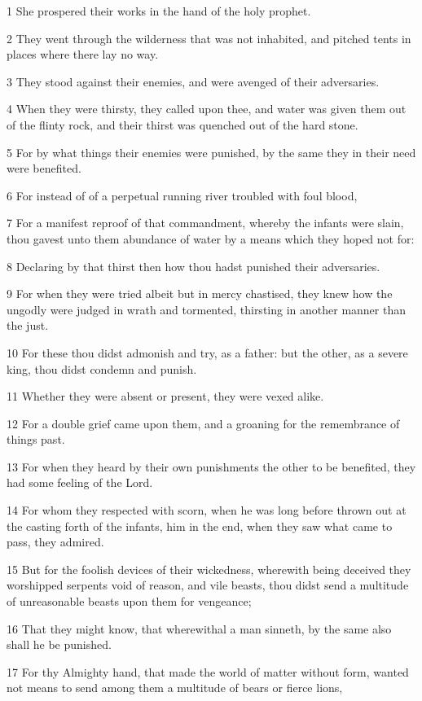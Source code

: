 \par 1 She prospered their works in the hand of the holy prophet.
\par 2 They went through the wilderness that was not inhabited, and pitched tents in places where there lay no way.
\par 3 They stood against their enemies, and were avenged of their adversaries.
\par 4 When they were thirsty, they called upon thee, and water was given them out of the flinty rock, and their thirst was quenched out of the hard stone.
\par 5 For by what things their enemies were punished, by the same they in their need were benefited.
\par 6 For instead of of a perpetual running river troubled with foul blood,
\par 7 For a manifest reproof of that commandment, whereby the infants were slain, thou gavest unto them abundance of water by a means which they hoped not for:
\par 8 Declaring by that thirst then how thou hadst punished their adversaries.
\par 9 For when they were tried albeit but in mercy chastised, they knew how the ungodly were judged in wrath and tormented, thirsting in another manner than the just.
\par 10 For these thou didst admonish and try, as a father: but the other, as a severe king, thou didst condemn and punish.
\par 11 Whether they were absent or present, they were vexed alike.
\par 12 For a double grief came upon them, and a groaning for the remembrance of things past.
\par 13 For when they heard by their own punishments the other to be benefited, they had some feeling of the Lord.
\par 14 For whom they respected with scorn, when he was long before thrown out at the casting forth of the infants, him in the end, when they saw what came to pass, they admired.
\par 15 But for the foolish devices of their wickedness, wherewith being deceived they worshipped serpents void of reason, and vile beasts, thou didst send a multitude of unreasonable beasts upon them for vengeance;
\par 16 That they might know, that wherewithal a man sinneth, by the same also shall he be punished.
\par 17 For thy Almighty hand, that made the world of matter without form, wanted not means to send among them a multitude of bears or fierce lions,
